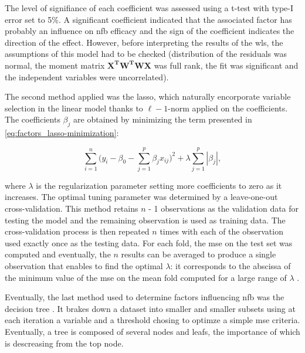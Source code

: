 The level of signifiance of each coefficient was assessed using a t-test  with type-I error set to 5\%. A significant coefficient indicated that the associated factor has probably an influence on \gls{nfb} efficacy and the sign of the coefficient indicates the direction of the effect.
However, before interpreting the results of the \gls{wls}, the assumptions of this model had to be checked (distribution of the residuals was normal,
the moment matrix $\mathbf{{X}^{T}W^{T}WX}$ was full rank, the fit was significant and the independent variables were uncorrelated).

The second method applied was the \gls{lasso}, which naturally encorporate variable selection 
in the linear model thanks to $\ell-1$-norm applied on the coefficients. The coefficients $\beta_j$ are obtained by minimizing the term 
presented in \cref{eq:factors_lasso-minimization}:

\begin{equation}
\label{eq:factors_lasso-minimization}
\sum_{i=1}^{n} \Big(y_i - \beta_{0} - \sum_{j=1}^{p}\beta_{j}x_{ij}\Big)^2 + \lambda \sum_{j=1}^{p}|\beta_{j}|,
\end{equation} 

where $\lambda$ is the regularization parameter setting more coefficients to zero as it increases. The optimal tuning parameter was determined 
by a leave-one-out cross-validation.  This method retains $n$ - 1 observations as the validation data for testing the model and the 
remaining observation is used as training data. The cross-validation process is then repeated $n$ times with each of the observation 
used exactly once as the testing data. For each fold, the \gls{mse} on the test set was computed and eventually, the $n$ results can 
be averaged to produce a single observation that enables to find the optimal $\lambda$: it corresponds to the abscissa of the minimum
value of the \gls{mse} on the mean fold computed for a large range of $\lambda$ \citep{James2013}. 

Eventually, the last method used to determine factors influencing \gls{nfb} was the decision tree \citep{}. It brakes down a dataset into smaller
and smaller subsets using at each iteration a variable and a threshold chosing to optimze a simple \gls{mse} criteria. Eventually, a tree is composed of several nodes and leafs, the importance of which is descreasing from the top node. 

